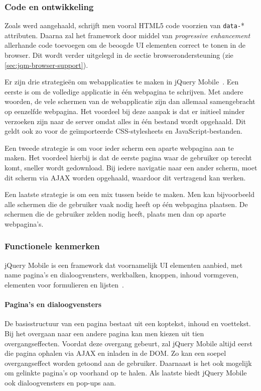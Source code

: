 \subsubsection{Code en ontwikkeling}
Zoals werd aangehaald, schrijft men vooral HTML5 code voorzien van \texttt{data-}* attributen. Daarna zal het framework door middel van \emph{progressive enhancement} allerhande code toevoegen om de beoogde UI elementen correct te tonen in de browser. Dit wordt verder uitgelegd in de sectie browserondersteuning (zie \ref{sec:jqm-browser-support}).

Er zijn drie strategieën om webapplicaties te maken in jQuery Mobile~\cite{Broulik2012}. Een eerste is om de volledige applicatie in één webpagina te schrijven. Met andere woorden,  de vele schermen van de webapplicatie zijn dan allemaal samengebracht op eenzelfde webpagina. Het voordeel bij deze aanpak is dat er initieel minder verzoeken zijn naar de server omdat alles in één bestand wordt opgehaald. Dit geldt ook zo voor de geïmporteerde CSS-stylesheets en JavaScript-bestanden. 

Een tweede strategie is om voor ieder scherm een aparte webpagina aan te maken. Het voordeel hierbij is dat de eerste pagina waar de gebruiker op terecht komt, sneller wordt gedownload. Bij iedere navigatie naar een ander scherm, moet dit scherm via AJAX worden opgehaald, waardoor dit vertragend kan werken. 

Een laatste strategie is om een mix tussen beide te maken. Men kan bijvoorbeeld alle schermen die de gebruiker vaak nodig heeft op één webpagina plaatsen. De schermen die de gebruiker zelden nodig heeft, plaats men dan op aparte webpagina's.  

\subsubsection{Functionele kenmerken}
jQuery Mobile is een framework dat voornamelijk UI elementen aanbied, met name pagina's en dialoogvensters, werkbalken, knoppen, inhoud vormgeven, elementen voor formulieren en lijsten~\cite{JQuery2012b}.

\paragraph{Pagina's en dialoogvensters}
De basisstructuur van een pagina bestaat uit een koptekst, inhoud en voettekst. Bij het overgaan naar een andere pagina kan men kiezen uit tien overgangseffecten. Voordat deze overgang gebeurt, zal jQuery Mobile altijd eerst die pagina ophalen via AJAX en inladen in de DOM. Zo kan een soepel overgangseffect worden getoond aan de gebruiker. Daarnaast is het ook mogelijk om gelinkte pagina's op voorhand op te halen. Als laatste biedt jQuery Mobile ook dialoogvensters en pop-ups aan. 

